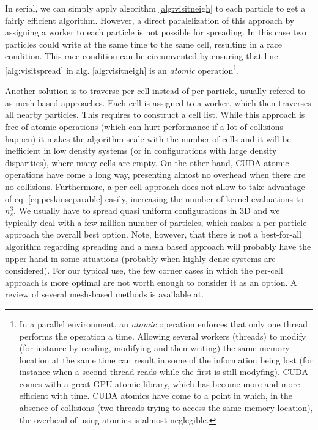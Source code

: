 \documentclass[ twoside,openright,titlepage,numbers=noenddot,%
headinclude,footinclude,cleardoublepage=empty,abstract=on,
BCOR=5mm,paper=a4,fontsize=11pt, dvipsnames
]{scrreprt}
\begin{document}
In serial, we can simply apply algorithm \ref{alg:visitneigh} to each particle to get a fairly efficient algorithm. However, a direct paralelization of this approach by assigning a worker to each particle is not possible for spreading. In this case two particles could write at the same time to the same cell, resulting in a race condition. This race condition can be circumvented by ensuring that line \ref{alg:visitspread} in alg. \ref{alg:visitneigh} is an \emph{atomic} operation\footnote{In a parallel environment, an \emph{atomic} operation enforces that only one thread performs the operation a time. Allowing several workers (threads) to modify (for instance by reading, modifying and then writing) the same memory location at the same time can result in some of the information being lost (for instance when a second thread reads while the first is still modyfing). CUDA comes with a great GPU atomic library, which has become more and more efficient with time. CUDA atomics have come to a point in which, in the absence of collisions (two threads trying to access the same memory location), the overhead of using atomics is almost neglegible.}.

Another solution is to traverse per cell instead of per particle, usually refered to as mesh-based approaches. Each cell is assigned to a worker, which then traverses all nearby particles. This requires to construct a cell list. While this approach is free of atomic operations (which can hurt performance if a lot of collisions happen) it makes the algorithm scale with the number of cells and it will be inefficient in low density systems (or in configurations with large density disparities), where many cells are empty. On the other hand, CUDA atomic operations have come a long way, presenting almost no overhead when there are no collisions. Furthermore, a per-cell approach does not allow to take advantage of eq. \eqref{eq:peskinseparable} easily, increasing the number of kernel evaluations to $n_s^3$.
We usually have to spread quasi uniform configurations in 3D and we typically deal with a few million number of particles, which makes a per-particle approach the overall best option. Note, however, that there is not a best-for-all algorithm regarding spreading and a mesh based approach will probably have the upper-hand in some situations (probably when highly dense systems are considered).
For our typical use, the few corner cases in which the per-cell approach is more optimal are not worth enough to consider it as an option. A review of several mesh-based methods is available at\cite{Guo2015}.
\end{document}
